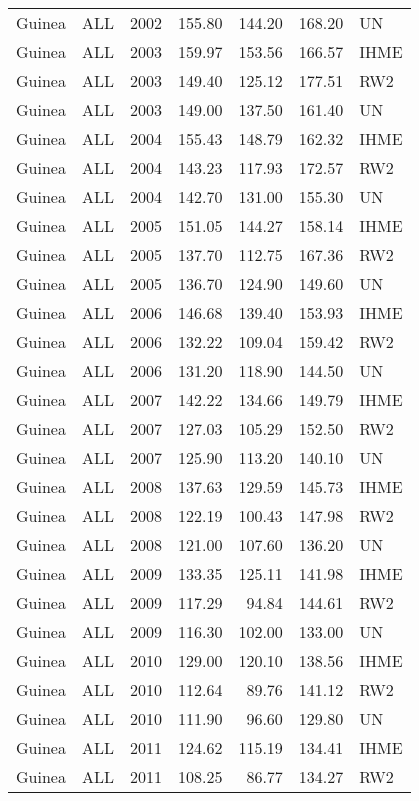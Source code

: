 \begin{longtable}{lllrrrl}
  Guinea & ALL & 2002 & 155.80 & 144.20 & 168.20 & UN \\ 
  Guinea & ALL & 2003 & 159.97 & 153.56 & 166.57 & IHME \\ 
  Guinea & ALL & 2003 & 149.40 & 125.12 & 177.51 & RW2 \\ 
  Guinea & ALL & 2003 & 149.00 & 137.50 & 161.40 & UN \\ 
  Guinea & ALL & 2004 & 155.43 & 148.79 & 162.32 & IHME \\ 
  Guinea & ALL & 2004 & 143.23 & 117.93 & 172.57 & RW2 \\ 
  Guinea & ALL & 2004 & 142.70 & 131.00 & 155.30 & UN \\ 
  Guinea & ALL & 2005 & 151.05 & 144.27 & 158.14 & IHME \\ 
  Guinea & ALL & 2005 & 137.70 & 112.75 & 167.36 & RW2 \\ 
  Guinea & ALL & 2005 & 136.70 & 124.90 & 149.60 & UN \\ 
  Guinea & ALL & 2006 & 146.68 & 139.40 & 153.93 & IHME \\ 
  Guinea & ALL & 2006 & 132.22 & 109.04 & 159.42 & RW2 \\ 
  Guinea & ALL & 2006 & 131.20 & 118.90 & 144.50 & UN \\ 
  Guinea & ALL & 2007 & 142.22 & 134.66 & 149.79 & IHME \\ 
  Guinea & ALL & 2007 & 127.03 & 105.29 & 152.50 & RW2 \\ 
  Guinea & ALL & 2007 & 125.90 & 113.20 & 140.10 & UN \\ 
  Guinea & ALL & 2008 & 137.63 & 129.59 & 145.73 & IHME \\ 
  Guinea & ALL & 2008 & 122.19 & 100.43 & 147.98 & RW2 \\ 
  Guinea & ALL & 2008 & 121.00 & 107.60 & 136.20 & UN \\ 
  Guinea & ALL & 2009 & 133.35 & 125.11 & 141.98 & IHME \\ 
  Guinea & ALL & 2009 & 117.29 & 94.84 & 144.61 & RW2 \\ 
  Guinea & ALL & 2009 & 116.30 & 102.00 & 133.00 & UN \\ 
  Guinea & ALL & 2010 & 129.00 & 120.10 & 138.56 & IHME \\ 
  Guinea & ALL & 2010 & 112.64 & 89.76 & 141.12 & RW2 \\ 
  Guinea & ALL & 2010 & 111.90 & 96.60 & 129.80 & UN \\ 
  Guinea & ALL & 2011 & 124.62 & 115.19 & 134.41 & IHME \\ 
  Guinea & ALL & 2011 & 108.25 & 86.77 & 134.27 & RW2 \\ 

\end{longtable}
